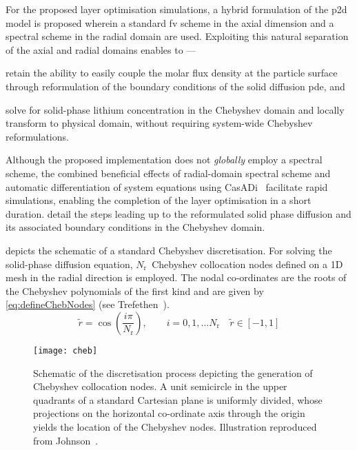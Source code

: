     For the proposed layer optimisation simulations, a hybrid formulation of the
    \gls{p2d} model is proposed wherein a  standard \gls{fv} scheme in the axial
    dimension and  a spectral scheme in  the radial domain are  used. Exploiting
    this natural separation of the axial and radial domains enables to ---
    \begin{enumerate*}[label=\roman*)]
        \item retain  the   ability  to  easily   couple  the   molar  flux  density   at  the particle  surface  through  reformulation  of the  boundary  conditions  of  the solid  diffusion \gls{pde},  and
        \item solve  for  solid-phase  lithium  concentration  in  the  Chebyshev  domain  and locally transform  to physical  domain, without requiring  system-wide Chebyshev reformulations.
    \end{enumerate*}
    Although  the  proposed  implementation   does  not  \emph{globally}  employ
    a  spectral  scheme,  the   combined  beneficial  effects  of  radial-domain
    spectral   scheme  and   automatic  differentiation   of  system   equations
    using  CasADi~\cite{Andersson2013b} facilitate  rapid simulations,  enabling
    the   completion  of   the   layer  optimisation   in   a  short   duration.
      detail  the  steps
    leading  up to  the reformulated  solid phase  diffusion and  its associated
    boundary conditions in the Chebyshev domain.

    

     depicts the schematic of a standard Chebyshev
    discretisation. For solving the solid-phase diffusion equation, $N_\text{r}$~Chebyshev   collocation  nodes  defined  on   a  1D  mesh
    in   the   radial   direction is employed. The nodal co-ordinates are the
    roots of the Chebyshev polynomials of the first kind and are given   by   \cref{eq:defineChebNodes}
    (see Trefethen~\cite{Trefethen2000}).
    \begin{equation}\label{eq:defineChebNodes}
        \widetilde{r} = \cos\left(\frac{i\pi}{N_\text{r}}\right), \qquad i = 0, 1, \dots N_\text{r} \quad \widetilde{r} \in [-1, 1]
    \end{equation}
    
    \begin{figure}[!htbp]
        \centering
        \texttt{[image: cheb]}
        \caption[Schematic illustraing Chebyshev discretisation]{Schematic of
            the discretisation process depicting the generation of
            Chebyshev collocation nodes. A unit semicircle in the upper
            quadrants of a standard Cartesian plane is uniformly
            divided, whose projections on the horizontal co-ordinate axis
            through the origin yields the location of the Chebyshev nodes.
        Illustration reproduced from Johnson~\cite{Chebfig2018}.}
        \label{fig:chebnodes}
    \end{figure}
    
